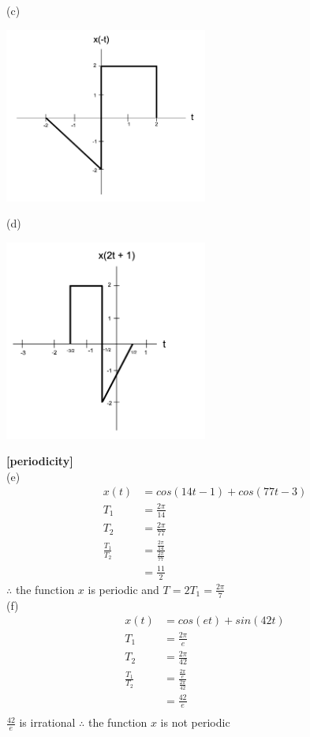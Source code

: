 \documentclass{article}
\begin{document}
(c)
\begin{center}
    \includegraphics[width=0.5\textwidth]{34c.png}
\end{center}

(d)
\begin{center}
    \includegraphics[width=0.5\textwidth]{34d.png}
\end{center}


 {\bf [periodicity]}\\
(e)
\begin{equation*}
\begin{split}
    x(t) &= cos(14t - 1) + cos(77t - 3)\\
    T_1 &= \frac{2\pi}{14}\\
    T_2 &= \frac{2\pi}{77}\\
    \frac{T_1}{T_2} &= \frac{\frac{2\pi}{14}}{\frac{2\pi}{77}}\\
    &= \frac{11}{2}
\end{split}
\end{equation*}
$\therefore$ the function $x$ is periodic and $T = 2T_1 = \frac{2 \pi}{7}$\\

(f)
\begin{equation*}
\begin{split}
    x(t) &= cos(et) + sin(42t)\\
    T_1 &= \frac{2\pi}{e}\\
    T_2 &= \frac{2\pi}{42}\\
    \frac{T_1}{T_2} &= \frac{\frac{2\pi}{e}}{\frac{2\pi}{42}}\\
    &= \frac{42}{e}\\
\end{split}
\end{equation*}
$\frac{42}{e}$ is irrational $\therefore$ the function $x$ is not periodic\\
\end{document}

